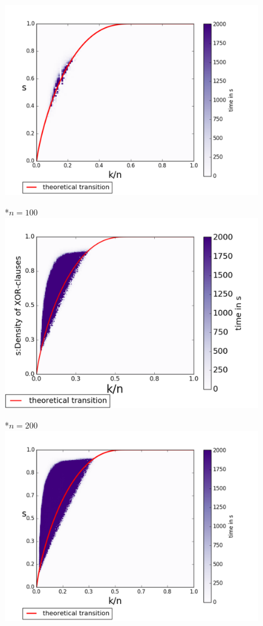 \begin{figure}
	\begin{multicols}{3}
		\includegraphics[width=1\linewidth]{pb-experiments/runtime/card/100.pdf}\par
		*{$n=100$}
		\includegraphics[width=1\linewidth]{pb-experiments/runtime/card/200.pdf}\par 
		*{$n=200$}
		\includegraphics[width=1\linewidth]{pb-experiments/runtime/card/300_runtime.pdf}\par

\end{multicols}
\end{figure}

